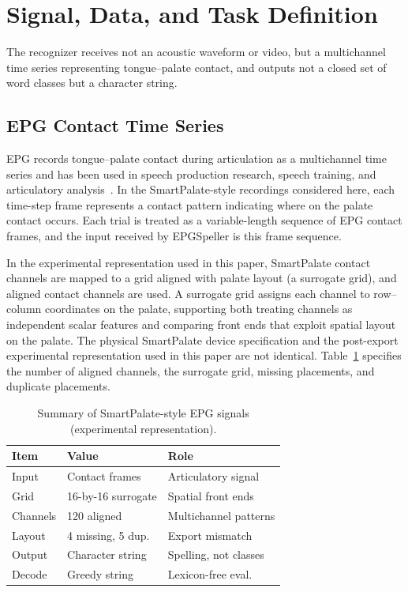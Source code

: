 \section{Signal, Data, and Task Definition}

The recognizer receives not an acoustic waveform or video, but a multichannel time series representing tongue--palate contact, and outputs not a closed set of word classes but a character string.

\subsection{EPG Contact Time Series}

EPG records tongue--palate contact during articulation as a multichannel time series and has been used in speech production research, speech training, and articulatory analysis~\cite{hardcastle1989new,hardcastle1990electropalatography,verhoeven2019visualisation}.
In the SmartPalate-style recordings considered here, each time-step frame represents a contact pattern indicating where on the palate contact occurs.
Each trial is treated as a variable-length sequence of EPG contact frames, and the input received by EPGSpeller is this frame sequence.

In the experimental representation used in this paper, SmartPalate contact channels are mapped to a grid aligned with palate layout (a surrogate grid), and aligned contact channels are used.
A surrogate grid assigns each channel to row--column coordinates on the palate, supporting both treating channels as independent scalar features and comparing front ends that exploit spatial layout on the palate.
The physical SmartPalate device specification and the post-export experimental representation used in this paper are not identical.
Table~\ref{tab:signal_summary} specifies the number of aligned channels, the surrogate grid, missing placements, and duplicate placements.

\begin{table}[t]
\centering
\caption{Summary of SmartPalate-style EPG signals (experimental representation).}
\label{tab:signal_summary}
\setlength{\tabcolsep}{2pt}
\renewcommand{\arraystretch}{1.05}
\begin{tabular}{@{}p{}p{}p{}@{}}
\toprule
Item & Value & Role \\
\midrule
Input & Contact frames & Articulatory signal \\
Grid & 16-by-16 surrogate & Spatial front ends \\
Channels & 120 aligned & Multichannel patterns \\
Layout & 4 missing, 5 dup. & Export mismatch \\
Output & Character string & Spelling, not classes \\
Decode & Greedy string & Lexicon-free eval. \\
\bottomrule
\end{tabular}
\end{table}

